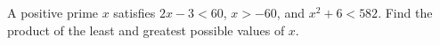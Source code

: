 A positive prime $x$ satisfies $2x-3<60$, $x>-60$, and $x^2+6<582$. Find the product of the least and greatest possible values of $x$.
